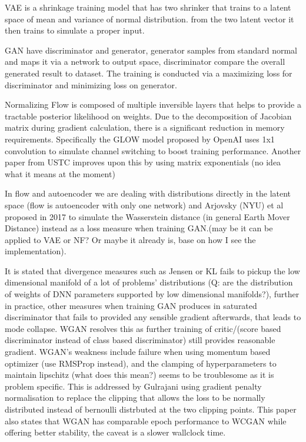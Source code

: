 \documentclass[honours,12pt]{unswthesis}
\numberwithin{equation}{section}
\begin{document}
VAE is a shrinkage training model that has two shrinker that trains to a latent space of mean and variance of normal distribution.
from the two latent vector it then trains to simulate a proper input.

GAN have discriminator and generator, generator samples from standard normal and maps it via a network to output space, discriminator compare the overall generated result to dataset. The training is conducted via a maximizing loss for discriminator and minimizing loss on generator.

Normalizing Flow is composed of multiple inversible layers that helps to provide a tractable posterior likelihood on weights. Due to the decomposition of Jacobian matrix during gradient calculation, there is a significant reduction in memory requirements. Specifically the GLOW model proposed by OpenAI \cite{openai2018glow} uses 1x1 convolution to simulate channel switching to boost training performance. Another paper from USTC improves upon this by using matrix exponentials (no idea what it means at the moment)

In flow and autoencoder we are dealing with distributions directly in the latent space (flow is autoencoder with only one network) and Arjovsky (NYU) \cite{PMLR2017_WGAN} et al proposed in 2017 to simulate the Wasserstein distance (in general Earth Mover Distance) instead as a loss measure when training GAN.(may be it can be applied to VAE or NF? Or maybe it already is, base on how I see the implementation). 

It is stated that divergence measures such as Jensen or KL fails to pickup the low dimensional manifold of a lot of problems' distributions (Q: are the distribution of weights of DNN parameters supported by low dimensional manifolds?), further in practice, other measures when training GAN produces in saturated discriminator that fails to provided any sensible gradient afterwards, that leads to mode collapse. WGAN resolves this as further training of critic/(score based discriminator instead of class based discriminator) still provides reasonable gradient. WGAN's weakness include failure when using momentum based optimizer (use RMSProp instead), and the clamping of hyperparameters to maintain lipschitz (what does this mean?) seems to be troublesome as it is problem specific. This is addressed by Gulrajani \cite{NIPS2017_WGAN-GP} using gradient penalty normalisation to replace the clipping that allows the loss to be normally distributed instead of bernoulli distrbuted at the two clipping points. This paper also states that WGAN has comparable epoch performance to WCGAN while offering better stability, the caveat is a slower wallclock time. 
\end{document}
